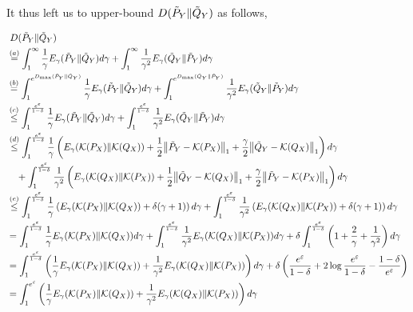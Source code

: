 \documentclass[onecolumn,ldraftcls, 11pt]{IEEEtran}
\newcommand{\nn}{\nonumber}
\newcommand{\eps}{\varepsilon}
\newcommand*{\cK}{\mathcal{K}}
\newcommand{\norm}[2]{{\left\lVert #1 \right\rVert}_{#2}}
\begin{document}
It thus left us to upper-bound $D(\Tilde{P}_Y\|\Tilde{Q}_Y)$ as follows,

\begin{align}
    &~D(\Tilde{P}_Y\|\Tilde{Q}_Y)\nn\\
    &\overset{(a)}{=} \int_{1}^{\infty} \frac{1}{\gamma} E_{\gamma}(\Tilde{P}_Y\|\Tilde{Q}_Y) d\gamma + \int_{1}^{\infty} \frac{1}{\gamma^2}E_{\gamma}(\Tilde{Q}_Y\|\Tilde{P}_Y) d\gamma\nn\\
    &\overset{(b)}{=} \int_{1}^{e^{D_{\max}(\Tilde{P}_Y\|\Tilde{Q}_Y)}} \frac{1}{\gamma} E_{\gamma}(\Tilde{P}_Y\|\Tilde{Q}_Y) d\gamma + \int_{1}^{e^{D_{\max}(\Tilde{Q}_Y\|\Tilde{P}_Y)}} \frac{1}{\gamma^2}E_{\gamma}(\Tilde{Q}_Y\|\Tilde{P}_Y) d\gamma\nn\\
    &\overset{(c)}{\leq}  \int_{1}^{\frac{e^\eps}{1-\delta}} \frac{1}{\gamma} E_{\gamma}(\Tilde{P}_Y\|\Tilde{Q}_Y) d\gamma + \int_{1}^{\frac{e^\eps}{1-\delta}} \frac{1}{\gamma^2}E_{\gamma}(\Tilde{Q}_Y\|\Tilde{P}_Y) d\gamma\nn\\
    &\overset{(d)}{\leq}  \int_{1}^{\frac{e^\eps}{1-\delta}} \frac{1}{\gamma} \left(E_{\gamma}({\cK}(P_X)\|{\cK}(Q_X)) + \frac{1}{2} \norm{\Tilde{P}_Y - {\cK}(P_X)}{1} + \frac{\gamma}{2}\norm{\Tilde{Q}_Y - {\cK}(Q_X)}{1}\right) d\gamma\nn\\
    &\quad + \int_{1}^{\frac{e^\eps}{1-\delta}} \frac{1}{\gamma^2}\left(E_{\gamma}({\cK}(Q_X)\|{\cK}(P_X)) + \frac{1}{2} \norm{\Tilde{Q}_Y - {\cK}(Q_X)}{1} + \frac{\gamma}{2}\norm{\Tilde{P}_Y - {\cK}(P_X)}{1}\right) d\gamma\nn\\
    &\overset{(e)}{\leq} \int_{1}^{\frac{e^\eps}{1-\delta}} \frac{1}{\gamma} \left(E_{\gamma}({\cK}(P_X)\|{\cK}(Q_X)) + \delta(\gamma + 1)\right) d\gamma + \int_{1}^{\frac{e^\eps}{1-\delta}} \frac{1}{\gamma^2}\left(E_{\gamma}({\cK}(Q_X)\|{\cK}(P_X)) + \delta(\gamma + 1)\right) d\gamma\nn\\
    &= \int_{1}^{\frac{e^\eps}{1-\delta}} \frac{1}{\gamma}E_{\gamma}({\cK}(P_X)\|{\cK}(Q_X)) d\gamma + \int_{1}^{\frac{e^\eps}{1-\delta}} \frac{1}{\gamma^2}E_{\gamma}({\cK}(Q_X)\|{\cK}(P_X))  d\gamma + \delta \int_{1}^{\frac{e^\eps}{1-\delta}} \left(1 + \frac{2}{\gamma} +\frac{1}{\gamma^2}\right)d\gamma\nn\\
    &= \int_{1}^{\frac{e^\eps}{1-\delta}} \left(\frac{1}{\gamma}E_{\gamma}({\cK}(P_X)\|{\cK}(Q_X)) + \frac{1}{\gamma^2}E_{\gamma}({\cK}(Q_X)\|{\cK}(P_X))\right)  d\gamma + \delta \left(\frac{e^\eps}{1-\delta} + 2\log\frac{e^\eps}{1-\delta}  - \frac{1-\delta}{e^\eps} \right)\nn\\
    &= \int_{1}^{e^\eps} \left(\frac{1}{\gamma}E_{\gamma}({\cK}(P_X)\|{\cK}(Q_X)) + \frac{1}{\gamma^2}E_{\gamma}({\cK}(Q_X)\|{\cK}(P_X))\right)  d\gamma \nn\\

\end{align}
\end{document}
